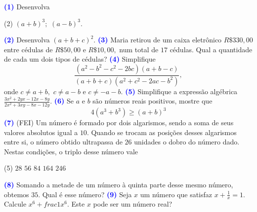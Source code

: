 \documentclass[12pt, a4paper]{article}
\newcommand{\negrito}[1]{\mbox{\boldmath{$#1$}}}
\begin{document}
\textcolor{blue}{\bf(1)} Desenvolva
\begin{tasks}[counter-format={(tsk[a])},label-width=3.6ex, label-format = {\bfseries}, column-sep = {0pt}](2)
\task[\textcolor{Floresta}{$\negrito{(a)} $}] $(a+b)^3;$
\task[\textcolor{Floresta}{$\negrito{(b)} $}] $(a-b)^3.$
\end{tasks}
\textcolor{blue}{\bf(2)} Desenvolva $(a + b+ c)^2.$
\newline\newline
\textcolor{blue}{\bf(3)} Maria retirou de um caixa eletrônico $R\$ 330,00$ entre cédulas de $R\$ 50,00$ e $R\$ 10,00,$ num total de $17$ cédulas. Qual a quantidade de cada um dois tipos de cédulas?
\newline\newline
\textcolor{blue}{\bf(4)} Simplifique 
\[
\frac{(a^2 - b^2 - c^2 - 2bc)(a+b - c)}{(a+b+c)(a^2 + c^2 - 2ac - b^2)},
\]
onde $c \neq a + b,$ $c \neq a - b$ e $c \neq - a  - b.$
\newline\newline
\textcolor{blue}{\bf(5)} Simplifique a expressão algébrica $\frac{3x^2 + 2yx - 12x - 8y}{2x^2 + 3xy -8x - 12y}.$
\newline\newline
\textcolor{blue}{\bf(6)} Se $a$ e $b$ são números reais positivos, mostre que
\[
4(a^3 + b^3) \ge (a+b)^3
\]
\textcolor{blue}{\bf(7)} (FEI) Um número é formado por dois algarismos, sendo a soma de seus valores absolutos igual a $10.$ Quando se trocam as posições desses algarismos entre si, o número obtido ultrapassa de $26$ unidades o dobro do número dado. Nestas condições, o triplo desse número vale
\begin{tasks}[counter-format={(tsk[a])},label-width=3.6ex, label-format = {\bfseries}, column-sep = {0pt}](5)
\task[\textcolor{Floresta}{$\negrito{(a)} $}] $28$
\task[\textcolor{Floresta}{$\negrito{(b)} $}] $56$
\task[\textcolor{Floresta}{$\negrito{(c)} $}] $84$
\task[\textcolor{Floresta}{$\negrito{(d)} $}] $164$
\task[\textcolor{Floresta}{$\negrito{(e)} $}] $246$
\end{tasks}
\textcolor{blue}{\bf(8)} Somando a metade de um número à quinta parte desse mesmo número, obtemos $35$. Qual é esse número?
\newline\newline
\textcolor{blue}{\bf(9)} Seja $x$ um número que satisfaz $x + \frac{1}{x} = 1$.
Calcule $x^6 + frac{1}{x^6}$. Este $x$ pode ser um número real?
\newline\newline
\end{document}
